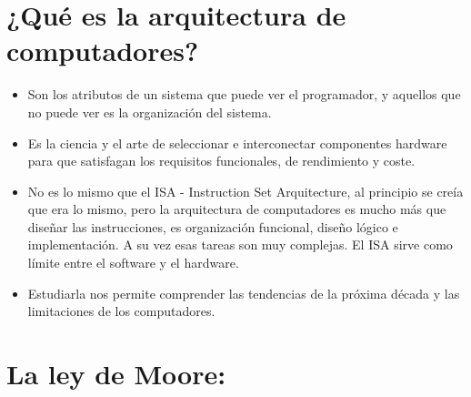 \documentclass[12pt, twoside, openright]{report} %
\begin{document}
  \section{¿Qué es la arquitectura de computadores?}

  \begin{itemize}
  
  \item
    Son los atributos de un sistema que puede ver el programador, y
    aquellos que no puede ver es la organización del sistema.
  \item
    Es la ciencia y el arte de seleccionar e interconectar componentes
    hardware para que satisfagan los requisitos funcionales, de
    rendimiento y coste.
  \item
    No es lo mismo que el ISA - Instruction Set Arquitecture, al
    principio se creía que era lo mismo, pero la arquitectura de
    computadores es mucho más que diseñar las instrucciones, es
    organización funcional, diseño lógico e implementación. A su vez
    esas tareas son muy complejas. El ISA sirve como límite entre el
    software y el hardware.
  \item
    Estudiarla nos permite comprender las tendencias de la próxima
    década y las limitaciones de los computadores.
  \end{itemize}

  \section{La ley de Moore:}
\end{document}
